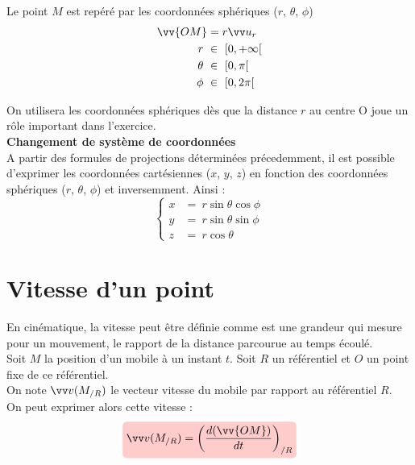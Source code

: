 \documentclass[10.5pt,a4paper]{book}
\begin{document}
\begin{boite}
\begin{minipage}{.5\textwidth}
\end{minipage}
\hfill
\begin{minipage}{.48\textwidth}
\begin{flushleft}
Le point $M$ est repéré par les coordonnées sphériques ($r$, $\theta$, $\phi$)
\begin{align*}
  \vv{OM} &= r \vv u_r  \\ r \ &\in \ [0, +\infty[ \\ \theta \ &\in \ [0, \pi[ \\ \phi \ &\in \ [0, 2\pi[
\end{align*}
\end{flushleft}
\end{minipage}

\vspace{5mm}

On utilisera les coordonnées sphériques dès que la distance $r$ au centre O joue un rôle important dans l’exercice.\\

\textbf{Changement de système de coordonnées}\\

A partir des formules de projections déterminées précedemment, il est possible d'exprimer les coordonnées cartésiennes ($x$, $y$, $z$) en fonction des coordonnées sphériques ($r$, $\theta$, $\phi$) et inversemment. Ainsi :
\begin{equation*}
    \begin{cases}
      x &= \ r \sin{\theta}\cos{\phi}  \\
      y &= \ r \sin{\theta}\sin{\phi} \\
      z &= \ r \cos{\theta}
    \end{cases}       
\end{equation*}
\end{boite}

\section{Vitesse d'un point}

En cinématique, la vitesse peut être définie comme est une grandeur qui mesure pour un mouvement, le rapport de la distance parcourue au temps écoulé.\\

Soit $M$ la position d'un mobile à un instant $t$. Soit $R$ un référentiel et $O$ un point fixe de ce référentiel.\\
On note $\vv v(M_{/R})$ le vecteur vitesse du mobile par rapport au référentiel $R$.\\
On peut exprimer alors cette vitesse :
\begin{align*}
    \tikz[baseline]{
        \node[fill=red!20,anchor=base,rounded corners]
        {$\vv v(M_{/R})=\left(\dfrac{d(\vv{OM})}{dt}\right)_{/R}$};
    } 
\end{align*}
\end{document}
